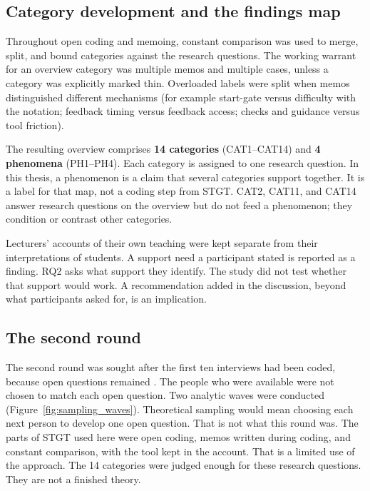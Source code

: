 \subsection{Category development and the findings map}
\label{subsec:method_categories}

Throughout open coding and memoing, constant comparison was used to merge, split, and bound categories against the research questions. The working warrant for an overview category was multiple memos and multiple cases, unless a category was explicitly marked thin. Overloaded labels were split when memos distinguished different mechanisms (for example start-gate versus difficulty with the notation; feedback timing versus feedback access; checks and guidance versus tool friction).

The resulting overview comprises \textbf{14 categories} (CAT1--CAT14) and \textbf{4 phenomena} (PH1--PH4). Each category is assigned to one research question. In this thesis, a phenomenon is a claim that several categories support together. It is a label for that map, not a coding step from STGT. CAT2, CAT11, and CAT14 answer research questions on the overview but do not feed a phenomenon; they condition or contrast other categories.

Lecturers' accounts of their own teaching were kept separate from their interpretations of students. A support need a participant stated is reported as a finding. RQ2 asks what support they identify. The study did not test whether that support would work. A recommendation added in the discussion, beyond what participants asked for, is an implication.

\subsection{The second round}
\label{subsec:method_sampling_saturation}

The second round was sought after the first ten interviews had been coded, because open questions remained \cite{adolph2011using,stol2016grounded}. The people who were available were not chosen to match each open question. Two analytic waves were conducted (Figure~\ref{fig:sampling_waves}). Theoretical sampling would mean choosing each next person to develop one open question. That is not what this round was. The parts of STGT used here were open coding, memos written during coding, and constant comparison, with the tool kept in the account. That is a limited use of the approach. The 14 categories were judged enough for these research questions. They are not a finished theory.

